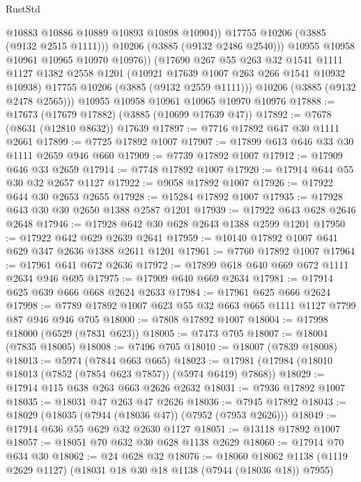 \begin{lexlean}{RustStd}
\begin{coremodule}
                  @10883
                  @10886
                  @10889
                  @10893
                  @10898
                  @10904))
              @17755
              @10206
              (@3885 (@9132 @2515 @1111)))
            @10206
            (@3885 (@9132 @2486 @2540)))
          @10955
          @10958
          @10961
          @10965
          @10970
          @10976))
      (@17690
        @267
        @55
        @263
        @32
        @1541
        @1111
        @1127
        @1382
        @2558
        @1201
        (@10921 @17639 @1007 @263 @266 @1541 @10932 @10938)
        @17755
        @10206
        (@3885 (@9132 @2559 @1111)))
      @10206
      (@3885 (@9132 @2478 @2565)))
    @10955
    @10958
    @10961
    @10965
    @10970
    @10976
@17888 := @17673 (@17679 @17882) (@3885 (@10699 @17639 @47))
@17892 := @7678 (@8631 (@12810 @8632)) @17639
@17897 := @7716 @17892 @647 @30 @1111 @2661
@17899 := @7725 @17892 @1007
@17907 := @17899 @613 @646 @33 @30 @1111 @2659 @946 @660
@17909 := @7739 @17892 @1007
@17912 := @17909 @646 @33 @2659
@17914 := @7748 @17892 @1007
@17920 := @17914 @644 @55 @30 @32 @2657 @1127
@17922 := @9058 @17892 @1007
@17926 := @17922 @644 @30 @2653 @2655
@17928 := @15284 @17892 @1007
@17935 := @17928 @643 @30 @30 @2650 @1388 @2587 @1201
@17939 := @17922 @643 @628 @2646 @2648
@17946 := @17928 @642 @30 @628 @2643 @1388 @2599 @1201
@17950 := @17922 @642 @629 @2639 @2641
@17959 := @10140 @17892 @1007 @641 @629 @347 @2636 @1388 @2611 @1201
@17961 := @7760 @17892 @1007
@17964 := @17961 @641 @672 @2636
@17972 := @17899 @618 @640 @669 @672 @1111 @2634 @946 @695
@17975 := @17909 @640 @669 @2634
@17981 := @17914 @625 @639 @666 @668 @2624 @2633
@17984 := @17961 @625 @666 @2624
@17998 := @7789 @17892 @1007 @623 @55 @32 @663 @665 @1111 @1127 @7799 @87 @946 @946 @705
@18000 := @7808 @17892 @1007
@18004 := @17998 @18000 (@6529 (@7831 @623))
@18005 := @7473 @705
@18007 := @18004 (@7835 @18005)
@18008 := @7496 @705
@18010 := @18007 (@7839 @18008)
@18013 := @5974 (@7844 @663 @665)
@18023 := @17981 (@17984 (@18010 @18013 (@7852 (@7854 @623 @7857)) (@5974 @6419) @7868))
@18029 := @17914 @115 @638 @263 @663 @2626 @2632
@18031 := @7936 @17892 @1007
@18035 := @18031 @47 @263 @47 @2626
@18036 := @7945 @17892
@18043 := @18029 (@18035 (@7944 (@18036 @47)) (@7952 (@7953 @2626)))
@18049 := @17914 @636 @55 @629 @32 @2630 @1127
@18051 := @13118 @17892 @1007
@18057 := @18051 @70 @632 @30 @628 @1138 @2629
@18060 := @17914 @70 @634 @30
@18062 := @24 @628 @32
@18076 := @18060
    @18062
    @1138
    (@1119 @2629 @1127)
    (@18031 @18 @30 @18 @1138 (@7944 (@18036 @18)) @7955)

\end{coremodule}
\end{lexlean}

